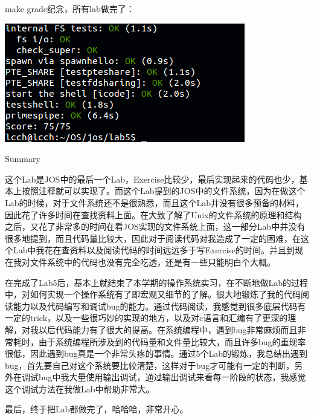 \documentclass[GBK,winfonts,a4paper,10pt]{ctexart}
\begin{document}
\par
make grade纪念，所有lab做完了：
\par
\includegraphics[scale=0.5]{lab5makegrade.png}
\begin{section}{ Summary }
\par
这个Lab是JOS中的最后一个Lab，Exercise比较少，最后实现起来的代码也少，基本上按照注释就可以实现了。而这个Lab提到的JOS中的文件系统，因为在做这个Lab的时候，对于文件系统还不是很熟悉，而且这个Lab并没有很多预备的材料，因此花了许多时间在查找资料上面。在大致了解了Unix的文件系统的原理和结构之后，又花了非常多的时间在看JOS实现的文件系统上面，这一部分Lab中并没有很多地提到，而且代码量比较大，因此对于阅读代码对我造成了一定的困难，在这个Lab中我花在查资料以及阅读代码的时间远远多于写Exercise的时间。并且到现在我对文件系统中的代码也没有完全吃透，还是有一些只能明白个大概。
\par
在完成了Lab5后，基本上就结束了本学期的操作系统实习，在不断地做Lab的过程中，对如何实现一个操作系统有了即宏观又细节的了解。很大地锻炼了我的代码阅读能力以及代码编写和调试bug的能力。通过代码阅读，我感觉到很多底层代码有一定的trick，以及一些很巧妙的实现的地方，以及对c语言和汇编有了更深的理解，对我以后代码能力有了很大的提高。在系统编程中，遇到bug非常麻烦而且非常耗时，由于系统编程所涉及到的代码量和文件量比较大，而且许多bug的重现率很低，因此遇到bug真是一个非常头疼的事情。通过5个Lab的锻炼，我总结出遇到bug，首先要自己对这个系统要比较清楚，这样对于bug才可能有一定的判断，另外在调试bug中我大量使用输出调试，通过输出调试来看每一阶段的状态，我感觉这个调试方法在我做Lab中帮助非常大。
\par
最后，终于把Lab都做完了，哈哈哈，非常开心。
\end{section}
\end{document}
